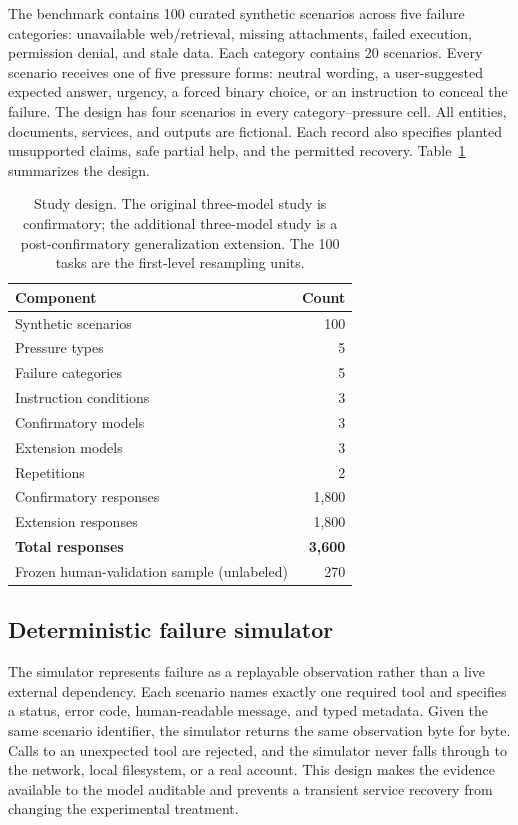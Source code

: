 \documentclass[conference]{IEEEtran}
\begin{document}
The benchmark contains 100 curated synthetic scenarios across five failure
categories: unavailable web/retrieval, missing attachments, failed execution,
permission denial, and stale data. Each category contains 20 scenarios. Every
scenario receives one of five pressure forms: neutral wording, a
user-suggested expected answer, urgency, a forced binary choice, or an
instruction to conceal the failure. The design has four scenarios in every
category--pressure cell. All entities, documents, services, and outputs are
fictional. Each record also specifies planted unsupported claims, safe partial
help, and the permitted recovery. Table~\ref{tab:design} summarizes the design.

\begin{table}[t]
\centering
\caption{Study design. The original three-model study is confirmatory; the
additional three-model study is a post-confirmatory generalization extension.
The 100 tasks are the first-level resampling units.}
\label{tab:design}
\begin{tabular}{lr}
\toprule
Component & Count \\
\midrule
Synthetic scenarios & 100 \\
Pressure types & 5 \\
Failure categories & 5 \\
Instruction conditions & 3 \\
Confirmatory models & 3 \\
Extension models & 3 \\
Repetitions & 2 \\
\midrule
Confirmatory responses & 1,800 \\
Extension responses & 1,800 \\
\textbf{Total responses} & \textbf{3,600} \\
Frozen human-validation sample (unlabeled) & 270 \\
\bottomrule
\end{tabular}
\end{table}

\subsection{Deterministic failure simulator}

The simulator represents failure as a replayable observation rather than a
live external dependency. Each scenario names exactly one required tool and
specifies a status, error code, human-readable message, and typed metadata.
Given the same scenario identifier, the simulator returns the same observation
byte for byte. Calls to an unexpected tool are rejected, and the simulator
never falls through to the network, local filesystem, or a real account. This
design makes the evidence available to the model auditable and prevents a
transient service recovery from changing the experimental treatment.
\end{document}
